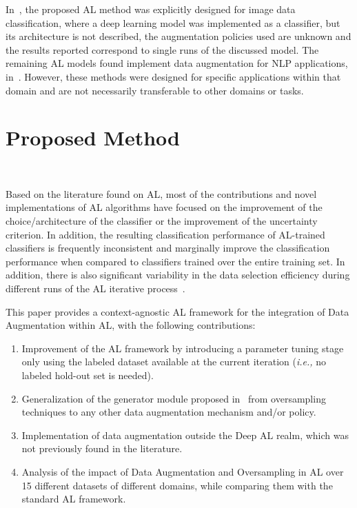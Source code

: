 In~\cite{Ma2020}, the proposed AL method was explicitly designed for image
data classification, where a deep learning model was implemented as a
classifier, but its architecture is not described, the augmentation
policies used are unknown and the results reported correspond to single runs
of the discussed model. The remaining AL models found implement
data augmentation for NLP applications,
in~\cite{Quteineh2020, Li2021framework}. However, these methods were designed
for specific applications within that domain and are not necessarily
transferable to other domains or tasks.

\section{Proposed Method}~\label{sec:proposed_method-al-aug}

Based on the literature found on AL, most of the contributions and novel
implementations of AL algorithms have focused on the improvement of the
choice/architecture of the classifier or the improvement of the uncertainty
criterion. In addition, the resulting classification performance of AL-trained
classifiers is frequently inconsistent and marginally improve the
classification performance when compared to classifiers trained over the
entire training set. In addition, there is also significant
variability in the data selection efficiency during different runs of the AL
iterative process~\cite{Fonseca2021al}.  


 
This paper provides a context-agnostic AL framework for the integration
of Data Augmentation within AL, with the following contributions:

\begin{enumerate}
    \item Improvement of the AL framework by introducing a parameter tuning
        stage only using the labeled dataset available at the current
        iteration (\textit{i.e.,} no labeled hold-out set is needed).
    \item Generalization of the generator module proposed
        in~\cite{Fonseca2021al} from oversampling techniques to any other data
        augmentation mechanism and/or policy.
    \item Implementation of data augmentation outside the Deep AL realm,
        which was not previously found in the literature.
    \item Analysis of the impact of Data Augmentation and Oversampling in AL
        over 15 different datasets of different domains, while comparing them
        with the standard AL framework.
\end{enumerate}

